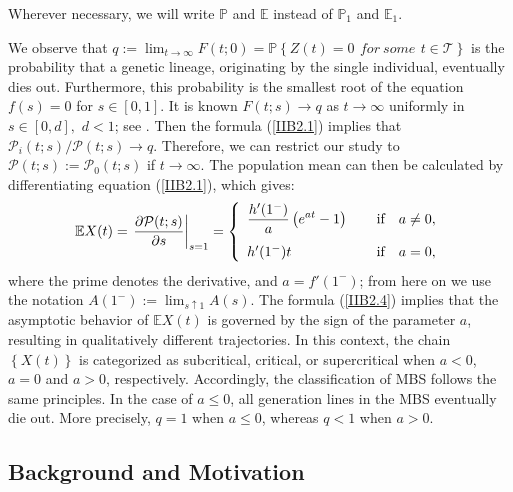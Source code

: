 \documentclass[10pt,reqno]{amsart}
\theoremstyle{definition}
\numberwithin{equation}{section}
\begin{document}
    Wherever necessary, we will write ${\mathbb{P}}$ and ${\mathbb{E}}$ instead of ${\mathbb{P}_1}$ and ${\mathbb{E}}_1$.

    We observe that $q:={{\lim}_{t\to\infty}}F(t;0)=\mathbb{P}\left\{Z(t)=0\ \, for\ some \ \, t\in\mathcal{T}\right\}$
    is the probability that a genetic lineage, originating  by the single individual, eventually dies out. Furthermore,
    this probability is the smallest root of the equation $f(s)=0$ for $s\in[0,1]$. It is known $F(t;s)\to{q}$
    as $t\to\infty$ uniformly  in $s\in[0,d],\,\,d<1$; see {\cite[Ch.I\!I\!I]{ANey}}. Then the formula {(\ref{IIB2.1})}
    implies that ${{{\mathcal{P}}_{i}}(t;s)}\big/{\mathcal{P}(t;s)}\to{q}$. Therefore, we can restrict our study to
    $\mathcal{P}(t;s):={{\mathcal{P}}_{0}}(t;s)$ if $t\to\infty$. The population mean can then be calculated by
    differentiating equation {(\ref{IIB2.1})}, which gives:
\begin{eqnarray}                  \label{IIB2.4}
    \mathbb{E}X(t)={{\left.\frac{\partial \mathcal{P}(t;s)}{\partial{s}}\right|}_{s=1}}=
\left\{
\begin{array}{l}
    \displaystyle\frac{{h}'({{1}^{-}})}{a}\left( {{e}^{at}}-1 \right)
    \qquad \hfill {\text{if}} \quad {a\ne{0},}
\vspace{2.8mm}  \\
    {h}'({{1}^{-}})t   \qquad \hfill {\text{if}} \quad {a=0,}\\
\end{array}
\right.
\end{eqnarray}
    where the prime denotes the derivative, and $a={f}'({{1}^{-}})$; from here on we use the notation
    $A({{1}^{-}}):={{\lim }_{s\uparrow 1}}A(s)$. The formula {(\ref{IIB2.4})} implies that the asymptotic behavior
    of $\mathbb{E}X(t)$ is governed by the sign of the parameter $a$, resulting in qualitatively different trajectories.
    In this context, the chain $\left\{X(t)\right\}$ is categorized as subcritical, critical, or supercritical
    when $a<0$, $a=0$ and $a>0$, respectively. Accordingly, the classification of MBS follows the same principles.
    In the case of $a\le{0}$, all generation lines in the MBS eventually die out. More precisely, $q=1$
    when $a\le{0}$, whereas $q<1$ when $a>0$.




\subsection{\textbf{Background and Motivation}}             \label{IIBSubsec2.2}
\end{document}

